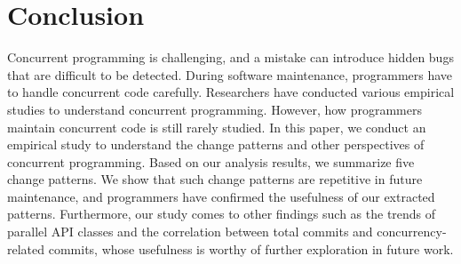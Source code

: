 \section{Conclusion}
\label{sec:conclude}
Concurrent programming is challenging, and a mistake can introduce hidden bugs that are difficult to be detected. During software maintenance, programmers have to handle concurrent code carefully. Researchers have conducted various empirical studies to understand concurrent programming. However, how programmers maintain concurrent code is still rarely studied. In this paper, we conduct an empirical study to understand the change patterns and other perspectives of concurrent programming. Based on our analysis results, we summarize five change patterns. We show that such change patterns are repetitive in future maintenance, and programmers have confirmed the usefulness of our extracted patterns. Furthermore, our study comes to other findings such as the trends of parallel API classes and the correlation between total commits and concurrency-related commits, whose usefulness is worthy of further exploration in future work.

